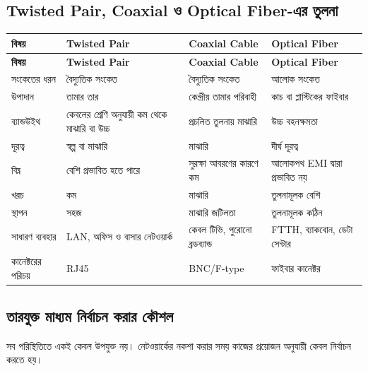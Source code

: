 \subsection{Twisted Pair, Coaxial ও Optical Fiber-এর তুলনা}

\begingroup
\begin{longtable}{|p{}|p{}|p{}|p{}|}
\hline
\textbf{বিষয়} & \textbf{Twisted Pair} & \textbf{Coaxial Cable} & \textbf{Optical Fiber} \\
\hline
\endfirsthead
\hline
\textbf{বিষয়} & \textbf{Twisted Pair} & \textbf{Coaxial Cable} & \textbf{Optical Fiber} \\
\hline
\endhead

সংকেতের ধরন & বৈদ্যুতিক সংকেত & বৈদ্যুতিক সংকেত & আলোক সংকেত \\
\hline
উপাদান & তামার তার & কেন্দ্রীয় তামার পরিবাহী & কাচ বা প্লাস্টিকের ফাইবার \\
\hline
ব্যান্ডউইথ & কেবলের শ্রেণি অনুযায়ী কম থেকে মাঝারি বা উচ্চ & প্রচলিত তুলনায় মাঝারি & উচ্চ বহনক্ষমতা \\
\hline
দূরত্ব & স্বল্প বা মাঝারি & মাঝারি & দীর্ঘ দূরত্ব \\
\hline
বিঘ্ন & বেশি প্রভাবিত হতে পারে & সুরক্ষা আবরণের কারণে কম & আলোকপথ EMI দ্বারা প্রভাবিত নয় \\
\hline
খরচ & কম & মাঝারি & তুলনামূলক বেশি \\
\hline
স্থাপন & সহজ & মাঝারি জটিলতা & তুলনামূলক কঠিন \\
\hline
সাধারণ ব্যবহার & LAN, অফিস ও বাসার নেটওয়ার্ক & কেবল টিভি, পুরোনো ব্রডব্যান্ড & FTTH, ব্যাকবোন, ডেটা সেন্টার \\
\hline
কানেক্টরের পরিচয় & RJ45 & BNC/F-type & ফাইবার কানেক্টর \\
\hline
\end{longtable}
\endgroup

\subsection{তারযুক্ত মাধ্যম নির্বাচন করার কৌশল}

সব পরিস্থিতিতে একই কেবল উপযুক্ত নয়। নেটওয়ার্কের নকশা করার সময় কাজের প্রয়োজন অনুযায়ী কেবল নির্বাচন করতে হয়।

